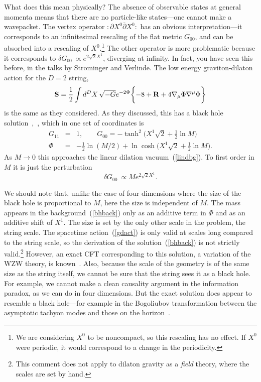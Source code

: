 What does this mean physically?  The absence of observable states at
general momenta means that there are no particle-like states---one
cannot make a wavepacket.  The vertex operator
$:\! \partial X^0 \bar\partial X^0  \!:$ has an obvious
interpretation---it corresponds to an infinitesimal rescaling of the
flat metric $G_{00}$, and can be absorbed into a rescaling of
$X^0$.\footnote
{We are considering $X^0$ to be noncompact, so this rescaling has no
effect.  If $X^0$ were periodic, it would correspond to a change
in the periodicity.}
The other operator is more problematic because it corresponds to
$\delta G_{00}\ \propto  e^{2\sqrt 2 X^1}$,
diverging at infinity.
In fact, you have seen this before, in the talks by Strominger and
Verlinde.  The low energy graviton-dilaton action for the $D=2$
string,
\begin{equation}
{\bf {S}} = \frac{1}{2} \int d^D X\, \sqrt{-G} e^{-2 \Phi}
\biggl\{ - 8 + {\bf {R}} 
+4 \nabla_\mu \Phi \nabla^\mu \Phi  \biggr\}  \label{gdact}
\end{equation}
is the same as they considered.  As they discussed, this has
a black hole solution~\cite{Wbh},~\cite{MSWbh}, which in one set of
coordinates is
\begin{eqnarray}
G_{11} &=& 1,\qquad G_{00} = -\tanh^2
\biggl(X^1\sqrt{2} + \frac{1}{2} \ln M \biggr)
\nonumber\\
\Phi &=& -\frac{1}{2}\ln (M/2) + \ln \cosh \biggl( X^1\sqrt{2} +
\frac{1}{2} \ln M \biggr). \label{bhback}
\end{eqnarray}
As $M \to 0$ this approaches the linear dilation
vacuum~(\ref{lindbg}).  To first order in $M$ it is just the
perturbation 
\begin{equation}
\delta G_{00}\ \propto M e^{2\sqrt 2 X^1}. \label{grav}
\end{equation}

We should note that, unlike the case of four dimensions where the
size of the black hole is proportional to $M$, here the size is
independent of $M$.  The mass appears in the background~(\ref{bhback})
only as an additive term in $\Phi$ and as an additive shift
of $X^1$.  The size is set by the only other scale in the problem,
the string scale.  The spacetime action~(\ref{gdact}) is only valid
at scales long compared to the string scale, so the derivation of
the solution~(\ref{bhback}) is not strictly valid.\footnote
{This comment does not apply to dilaton gravity as a {\it field}
theory, where the scales are set by hand.}   However, an exact CFT
corresponding to this solution, a variation of the WZW theory, is
known~\cite{Wbh}.  Also, because the scale of the geometry is of the
same size as the string itself, we cannot be sure that the string
sees it as a black hole.  For example, we cannot make a clean 
causality argument in the information paradox, as we can do in four
dimensions.
But the exact solution does appear to resemble a black
hole---for example in the Bogoliubov transformation 
between the asymptotic tachyon modes and those on the
horizon~\cite{DVVbh}.

